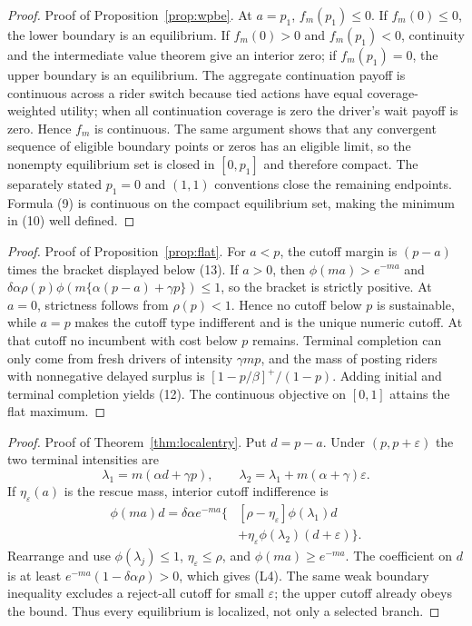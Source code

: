 \documentclass[mnsc,dblanonrev]{informs4}
\newcommand{\ph}{\phi}
\begin{document}
\begin{APPENDICES}
\begin{proof}{Proof of Proposition~\ref{prop:wpbe}.}
At $a=p_1$, $f_m(p_1)\le0$.  If $f_m(0)\le0$, the lower boundary is an
equilibrium.  If $f_m(0)>0$ and $f_m(p_1)<0$, continuity and the intermediate
value theorem give an interior zero; if $f_m(p_1)=0$, the upper boundary is
an equilibrium.  The aggregate continuation payoff is continuous across a
rider switch because tied actions have equal coverage-weighted utility;
when all continuation coverage is zero the driver's wait payoff is zero.
Hence $f_m$ is continuous.  The same argument shows that any convergent
sequence of eligible boundary points or zeros has an eligible limit, so the
nonempty equilibrium set is closed in $[0,p_1]$ and therefore compact.
The separately stated $p_1=0$ and $(1,1)$ conventions close the remaining
endpoints.  Formula (9) is continuous on the compact equilibrium set, making
the minimum in (10) well defined.
\Halmos\end{proof}

\begin{proof}{Proof of Proposition~\ref{prop:flat}.}
For $a<p$, the cutoff margin is $(p-a)$ times the bracket displayed below
(13).  If $a>0$, then $\ph(ma)>e^{-ma}$ and
$\delta\alpha\rho(p)\ph(m\{\alpha(p-a)+\gamma p\})\le1$, so the bracket is
strictly positive.  At $a=0$, strictness follows from $\rho(p)<1$.  Hence no
cutoff below $p$ is sustainable, while $a=p$ makes the cutoff type indifferent
and is the unique numeric cutoff.  At that cutoff no incumbent with cost
below $p$ remains.  Terminal completion can only come from fresh drivers of
intensity $\gamma mp$, and the mass of posting riders with nonnegative
delayed surplus is $[1-p/\beta]^+/(1-p)$.  Adding initial and terminal
completion yields (12).  The continuous objective on $[0,1]$ attains the
flat maximum.
\Halmos\end{proof}

\begin{proof}{Proof of Theorem~\ref{thm:localentry}.}
Put $d=p-a$.  Under $(p,p+\varepsilon)$ the two terminal intensities are
\[
 \lambda_1=m(\alpha d+\gamma p),\qquad
 \lambda_2=\lambda_1+m(\alpha+\gamma)\varepsilon.           \tag{A1}
\]
If $\eta_\varepsilon(a)$ is the rescue mass, interior cutoff indifference is
\[
 \begin{aligned}
 \ph(ma)d=\delta\alpha e^{-ma}\{&[\rho-\eta_\varepsilon]
 \ph(\lambda_1)d\\
 &+\eta_\varepsilon\ph(\lambda_2)(d+\varepsilon)\}.
 \end{aligned}                                               \tag{A2}
\]
Rearrange and use $\ph(\lambda_j)\le1$,
$\eta_\varepsilon\le\rho$, and $\ph(ma)\ge e^{-ma}$.  The
coefficient on $d$ is at least $e^{-ma}(1-\delta\alpha\rho)>0$, which gives
(L4).  The same weak boundary inequality excludes a reject-all cutoff for
small $\varepsilon$; the upper cutoff already obeys the bound.  Thus every
equilibrium is localized, not only a selected branch.


\end{proof}
\end{APPENDICES}
\end{document}
